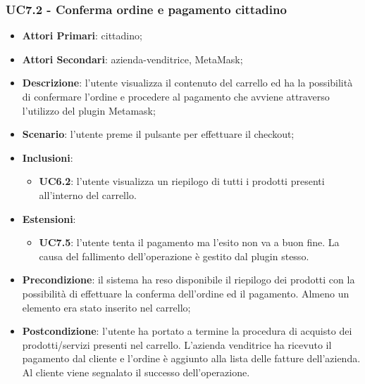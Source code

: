 \subsubsection{UC7.2 - Conferma ordine e pagamento cittadino}
\begin{itemize}
	\item \textbf{Attori Primari}: cittadino;
	\item \textbf{Attori Secondari}: azienda-venditrice, MetaMask\glo;
	\item \textbf{Descrizione}: l'utente visualizza il contenuto del carrello ed ha la possibilità di confermare l'ordine e procedere al pagamento che avviene attraverso l'utilizzo del plugin Metamask\glo;
	\item \textbf{Scenario}: l'utente preme il pulsante per effettuare il checkout;
	\item \textbf{Inclusioni}: 
	\begin{itemize}
		\item \textbf{UC6.2}: l'utente visualizza un riepilogo di tutti i prodotti presenti all'interno del carrello.
	\end{itemize}
	\item \textbf{Estensioni}: 
	\begin{itemize}
		\item \textbf{UC7.5}: l'utente tenta il pagamento ma l'esito non va a buon fine. La causa del fallimento dell'operazione è gestito dal plugin stesso.
	\end{itemize}
	\item \textbf{Precondizione}: il sistema ha reso disponibile il riepilogo dei prodotti con la possibilità di effettuare la conferma dell'ordine ed il pagamento. Almeno un elemento era stato inserito nel carrello; 
	\item \textbf{Postcondizione}: l'utente ha portato a termine la procedura di acquisto dei prodotti/servizi presenti nel carrello. L'azienda venditrice ha ricevuto il pagamento dal cliente e l'ordine è aggiunto alla lista delle fatture dell'azienda. Al cliente viene segnalato il successo dell'operazione.
\end{itemize}

